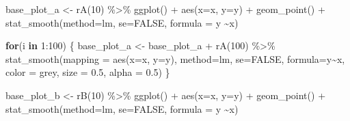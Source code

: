 \documentclass[
]{book}
\newenvironment{Shaded}{\begin{snugshade}}{\end{snugshade}}
\newcommand{\AttributeTok}[1]{\textcolor[rgb]{0.77,0.63,0.00}{#1}}
\newcommand{\ConstantTok}[1]{\textcolor[rgb]{0.00,0.00,0.00}{#1}}
\newcommand{\ControlFlowTok}[1]{\textcolor[rgb]{0.13,0.29,0.53}{\textbf{#1}}}
\newcommand{\DecValTok}[1]{\textcolor[rgb]{0.00,0.00,0.81}{#1}}
\newcommand{\FloatTok}[1]{\textcolor[rgb]{0.00,0.00,0.81}{#1}}
\newcommand{\FunctionTok}[1]{\textcolor[rgb]{0.00,0.00,0.00}{#1}}
\newcommand{\NormalTok}[1]{#1}
\newcommand{\OtherTok}[1]{\textcolor[rgb]{0.56,0.35,0.01}{#1}}
\newcommand{\SpecialCharTok}[1]{\textcolor[rgb]{0.00,0.00,0.00}{#1}}
\newcommand{\StringTok}[1]{\textcolor[rgb]{0.31,0.60,0.02}{#1}}
\theoremstyle{definition}
\theoremstyle{definition}
\theoremstyle{definition}
\theoremstyle{definition}
\theoremstyle{remark}
\begin{document}
\begin{Shaded}
\begin{Highlighting}[]
\NormalTok{base\_plot\_a }\OtherTok{\textless{}{-}} \FunctionTok{rA}\NormalTok{(}\DecValTok{10}\NormalTok{) }\SpecialCharTok{\%\textgreater{}\%}  
  \FunctionTok{ggplot}\NormalTok{() }\SpecialCharTok{+} 
  \FunctionTok{aes}\NormalTok{(}\AttributeTok{x=}\NormalTok{x, }\AttributeTok{y=}\NormalTok{y) }\SpecialCharTok{+} 
  \FunctionTok{geom\_point}\NormalTok{() }\SpecialCharTok{+} 
  \FunctionTok{stat\_smooth}\NormalTok{(}\AttributeTok{method=}\StringTok{\textquotesingle{}lm\textquotesingle{}}\NormalTok{, }\AttributeTok{se=}\ConstantTok{FALSE}\NormalTok{, }\AttributeTok{formula =} \StringTok{\textquotesingle{}y \textasciitilde{}x\textquotesingle{}}\NormalTok{)}

\ControlFlowTok{for}\NormalTok{(i }\ControlFlowTok{in} \DecValTok{1}\SpecialCharTok{:}\DecValTok{100}\NormalTok{) \{ }
\NormalTok{    base\_plot\_a }\OtherTok{\textless{}{-}}\NormalTok{ base\_plot\_a }\SpecialCharTok{+} \FunctionTok{rA}\NormalTok{(}\DecValTok{100}\NormalTok{) }\SpecialCharTok{\%\textgreater{}\%} 
      \FunctionTok{stat\_smooth}\NormalTok{(}\AttributeTok{mapping =} \FunctionTok{aes}\NormalTok{(}\AttributeTok{x=}\NormalTok{x, }\AttributeTok{y=}\NormalTok{y), }\AttributeTok{method=}\StringTok{\textquotesingle{}lm\textquotesingle{}}\NormalTok{, }\AttributeTok{se=}\ConstantTok{FALSE}\NormalTok{, }\AttributeTok{formula=}\StringTok{\textquotesingle{}y\textasciitilde{}x\textquotesingle{}}\NormalTok{, }\AttributeTok{color =} \StringTok{\textquotesingle{}grey\textquotesingle{}}\NormalTok{, }\AttributeTok{size =} \FloatTok{0.5}\NormalTok{, }\AttributeTok{alpha =} \FloatTok{0.5}\NormalTok{)}
\NormalTok{\}}

\NormalTok{base\_plot\_b }\OtherTok{\textless{}{-}} \FunctionTok{rB}\NormalTok{(}\DecValTok{10}\NormalTok{) }\SpecialCharTok{\%\textgreater{}\%}  
  \FunctionTok{ggplot}\NormalTok{() }\SpecialCharTok{+} 
  \FunctionTok{aes}\NormalTok{(}\AttributeTok{x=}\NormalTok{x, }\AttributeTok{y=}\NormalTok{y) }\SpecialCharTok{+} 
  \FunctionTok{geom\_point}\NormalTok{() }\SpecialCharTok{+} 
  \FunctionTok{stat\_smooth}\NormalTok{(}\AttributeTok{method=}\StringTok{\textquotesingle{}lm\textquotesingle{}}\NormalTok{, }\AttributeTok{se=}\ConstantTok{FALSE}\NormalTok{, }\AttributeTok{formula =} \StringTok{\textquotesingle{}y \textasciitilde{}x\textquotesingle{}}\NormalTok{)}


\end{Highlighting}
\end{Shaded}
\end{document}
